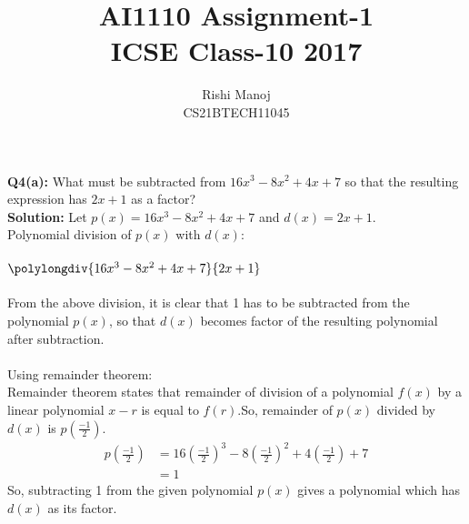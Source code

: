 \documentclass[journal,12pt,twocolumn]{IEEEtran}
\title{AI1110 Assignment-1\\ICSE Class-10 2017}
\author{Rishi Manoj\\CS21BTECH11045}
\begin{document}
\maketitle
\textbf{Q4(a):}
What must be subtracted from $16x^3-8x^2+4x+7$ so that the resulting expression has $2x+1$ as a factor?\\
\textbf{Solution:}
Let $p(x)=16x^3-8x^2+4x+7$ and $d(x)=2x+1$.\\
Polynomial division of $p(x)$ with $d(x)$:\\
\\
$\polylongdiv{16x^3-8x^2+4x+7}{2x+1}$
\\
\\
From the above division, it is clear that 1 has to be subtracted from the polynomial $p(x)$, so that $d(x)$ becomes factor of the resulting polynomial after subtraction.
\\
\\
Using remainder theorem:\\
Remainder theorem states that remainder of division of a polynomial $f(x)$ by a linear polynomial $x-r$ is equal to $f(r)$.So, remainder of $p(x)$ divided by $d(x)$ is $p(\frac{-1}{2})$.
\\
\begin{align}
      p(\frac{-1}{2}) &= 16(\frac{-1}{2})^3-8(\frac{-1}{2})^2+4(\frac{-1}{2})      +7
      \\
      &= 1
\end{align}
So, subtracting 1 from the given polynomial $p(x)$ gives a polynomial which has $d(x)$ as its factor.
\end{document}
